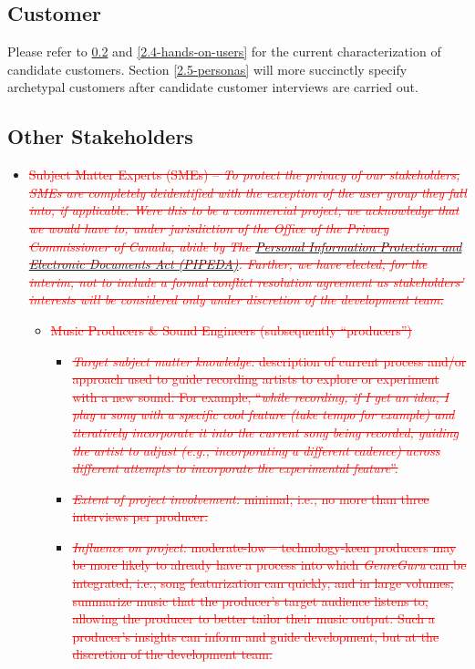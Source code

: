 \documentclass[12pt]{article}
\begin{document}
\subsection{Customer} \label{2.2-customer}
Please refer to \ref{2.3-other-stakeholders} and \ref{2.4-hands-on-users} for the current characterization of candidate customers. Section \ref{2.5-personas} will more succinctly specify archetypal customers after candidate customer interviews are carried out.
\subsection{Other Stakeholders} \label{2.3-other-stakeholders}
\begin{itemize}
  \item \textcolor{red}{\sout{Subject Matter Experts (SMEs) -- \emph{To protect the privacy of our stakeholders, SMEs are completely deidentified with the exception of the user group they fall into, if applicable. Were this to be a commercial project, we acknowledge that we would have to, under jurisdiction of the Office of the Privacy Commissioner of Canada, abide by The \href{https://www.priv.gc.ca/en/privacy-topics/privacy-laws-in-canada/the-personal-information-protection-and-electronic-documents-act-pipeda/}{Personal Information Protection and Electronic Documents Act (PIPEDA)}. Further, we have elected, for the interim, not to include a formal conflict resolution agreement as stakeholders' interests will be considered only under discretion of the development team.}}}
  
  \begin{itemize}
    \item \textcolor{red}{\sout{Music Producers \& Sound Engineers (subsequently ``producers'')}}
    \begin{itemize}
      \item \textcolor{red}{\sout{\emph{Target subject matter knowledge:} description of current process and/or approach used to guide recording artists to explore or experiment with a new \textcolor{red}{sound}. For example, ``\emph{while recording, if I get an idea, I play a song with a specific cool feature (take tempo for example) and iteratively incorporate it into the current song being recorded, guiding the artist to adjust (e.g., incorporating a different cadence) across different attempts to incorporate the experimental feature}''.}} 
      \item \textcolor{red}{\sout{\emph{Extent of project involvement:} minimal, i.e., no more than three interviews per producer.}}
      \item \textcolor{red}{\sout{\emph{Influence on project:} moderate-low -- technology-keen producers may be more likely to already have a process into which \emph{GenreGuru} can be integrated, i.e., song featurization can quickly, and in large volumes, summarize music that the producer's target audience listens to, allowing the producer to better tailor their music output. Such a producer's insights can inform and guide development, but at the discretion of the development team.}}
    \end{itemize}
    

\end{itemize}
\end{itemize}
\end{document}
